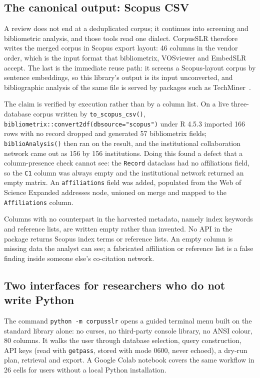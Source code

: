 \documentclass[final,5p,times,twocolumn]{elsarticle}
\begin{document}
\subsection{The canonical output: Scopus CSV}

A review does not end at a deduplicated corpus; it continues into screening
and bibliometric analysis, and those tools read one dialect. CorpusSLR
therefore writes the merged corpus in Scopus export layout: 46 columns in the
vendor order, which is the input format that bibliometrix, VOSviewer and
EmbedSLR~\cite{embedslr2025,embedslr2026} accept. The last is the immediate
reuse path: it screens a Scopus-layout corpus by sentence embeddings, so this
library's output is its input unconverted, and bibliographic analysis of the
same file is served by packages such as TechMiner~\cite{techminer2023}.

The claim is verified by execution rather than by a column list. On a live
three-database corpus written by \texttt{to\_scopus\_csv()},
\texttt{bibliometrix::convert2df(dbsource="scopus")} under R 4.5.3 imported
166 rows with no record dropped and generated 57 bibliometrix fields;
\texttt{biblioAnalysis()} then ran on the result, and the institutional
collaboration network came out as 156 by 156 institutions. Doing this found a
defect that a column-presence check cannot see: the \texttt{Record} dataclass
had no affiliations field, so the \texttt{C1} column was always empty and the
institutional network returned an empty matrix. An
\texttt{affiliations} field was added, populated from the Web of Science
Expanded addresses node, unioned on merge and mapped to the
\texttt{Affiliations} column.

Columns with no counterpart in the harvested metadata, namely index keywords
and reference lists, are written empty rather than invented. No API in the
package returns Scopus index terms or reference lists. An empty column is
missing data the analyst can see; a fabricated affiliation or reference list
is a false finding inside someone else's co-citation network.

\subsection{Two interfaces for researchers who do not write Python}

The command \texttt{python -m corpusslr} opens a guided terminal menu built on
the standard library alone: no curses, no third-party console library, no ANSI
colour, 80 columns. It walks the user through database selection, query
construction, API keys (read with \texttt{getpass}, stored with mode 0600,
never echoed), a dry-run plan, retrieval and export. A Google Colab notebook
covers the same workflow in 26 cells for users without a local Python
installation.
\end{document}
